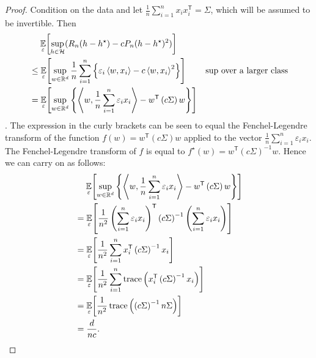 \documentclass[main.tex]{subfiles}
\begin{document}
\begin{proof}
  Condition on the data and let $\frac{1}{n}\sum_{i=1}^{n}
  x_{i}x_{i}^{\mathsf{T}} = \Sigma$, which will be assumed to be invertible.
  Then
  \begin{align*}
    &\hphantom{\leq}\,\,\,\underset{{\varepsilon}}{\mathbb{E}}\!\left[{
      \sup_{h \in \mathcal{H}} (R_{n}(h-h^{\star}) - cP_{n}(h - h^{\star})^{2})
    }\right] \\
    &\leq
    \underset{{\varepsilon}}{\mathbb{E}}\!\left[{
      \sup_{w \in \mathbb{R}^{d}} \frac{1}{n} \sum_{i=1}^{n}
      \left\{
        \varepsilon_{i}\left\langle {w}, {x_{i}} \right\rangle - c\left\langle {w}, {x_{i}} \right\rangle^{2}
      \right\}
  }\right] & \text{sup over a larger class} \\
    &=
    \underset{{\varepsilon}}{\mathbb{E}}\!\left[{
      \sup_{w \in \mathbb{R}^{d}}
      \left\{
        \left\langle {w}, {\frac{1}{n}\sum_{i=1}^{n}\varepsilon_{i}x_{i}} \right\rangle
        - w^{\mathsf{T}}\left(c\Sigma\right)w
      \right\}
    }\right]
  \end{align*}.
  The expression in the curly brackets can be seen to equal the
  Fenchel-Legendre transform of the function $f(w) = w^{\mathsf{T}}(c\Sigma)w$
  applied to the vector $\frac{1}{n}\sum_{i=1}^{n}\varepsilon_{i}x_{i}$.
  The Fenchel-Legendre transform of $f$ is equal to $f^{\star}(w) =
   w^{\mathsf{T}}(c\Sigma)^{-1}w$. Hence
  we can carry on as follows:
  \begin{align*}
    &\hphantom{\leq}\,\,\,\underset{{\varepsilon}}{\mathbb{E}}\!\left[{
      \sup_{w \in \mathbb{R}^{d}}
      \left\{
        \left\langle {w}, {\frac{1}{n}\sum_{i=1}^{n}\varepsilon_{i}x_{i}} \right\rangle
        - w^{\mathsf{T}}\left(c\Sigma\right)w
      \right\}
    }\right] \\
    &=
    \underset{{\varepsilon}}{\mathbb{E}}\!\left[{
      \frac{1}{n^{2}}
      \left(\sum_{i=1}^{n} \varepsilon_{i}x_{i}\right)^{\mathsf{T}}
      \left(c\Sigma\right)^{-1}
      \left(\sum_{i=1}^{n} \varepsilon_{i}x_{i}\right)
    }\right] \\
    &=
    \underset{{\varepsilon}}{\mathbb{E}}\!\left[{
      \frac{1}{n^{2}}
      \sum_{i=1}^{n}
      x_{i}^{\mathsf{T}}
      \left(c\Sigma\right)^{-1}
      x_{i}
    }\right] \\
    &=
    \underset{{\varepsilon}}{\mathbb{E}}\!\left[{
      \frac{1}{n^{2}}
      \sum_{i=1}^{n}
      \operatorname{trace}\left({x_{i}^{\mathsf{T}}
      \left(c\Sigma\right)^{-1}
      x_{i}}\right)
    }\right] \\
    &=
    \underset{{\varepsilon}}{\mathbb{E}}\!\left[{
      \frac{1}{n^{2}}
      \operatorname{trace}\left(
      \left(c\Sigma\right)^{-1}
      n\Sigma \right)
    }\right] \\
    &= \frac{d}{nc}.
  \end{align*}
\end{proof}
\end{document}
